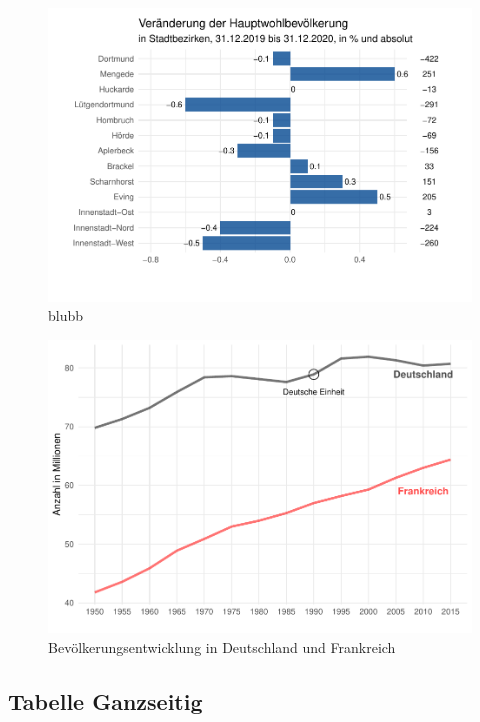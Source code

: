 \documentclass[
  a4paper,
  twoside]{article}
\begin{document}
\begin{figure}
\includegraphics[width=1\linewidth]{2021-03-02_Beispiel_files/figure-latex/unnamed-chunk-4-1} \caption{blubb}\label{fig:unnamed-chunk-4}
\end{figure}

\begin{figure}
\includegraphics[width=1\linewidth]{2021-03-02_Beispiel_files/figure-latex/unnamed-chunk-5-1} \caption{Bevölkerungsentwicklung in Deutschland und Frankreich}\label{fig:unnamed-chunk-5}
\end{figure}

\newpage

\hypertarget{tabelle-ganzseitig}{%
\subsection{Tabelle Ganzseitig}\label{tabelle-ganzseitig}}
\end{document}
